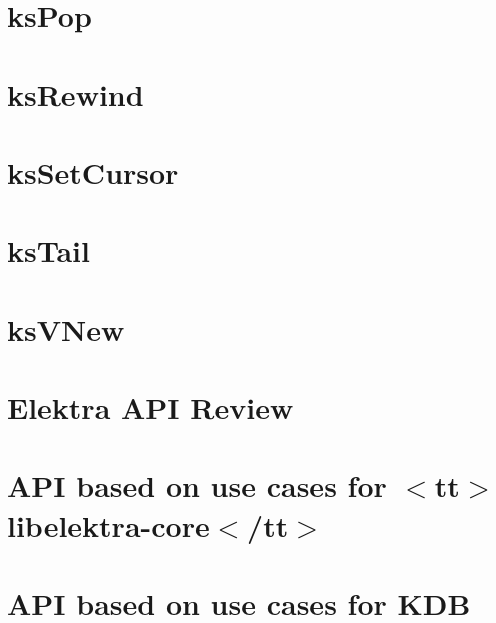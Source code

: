 \let\mypdfximage\pdfximage\def\pdfximage{\immediate\mypdfximage}\documentclass[twoside]{book}
\newcommand{\+}{\discretionary{\mbox{\scriptsize$\hookleftarrow$}}{}{}}
\begin{document}
\chapter{ks\+Pop}
\label{doc_contrib_api_reviews_core_ksPop_md}

\chapter{ks\+Rewind}
\label{doc_contrib_api_reviews_core_ksRewind_md}

\chapter{ks\+Set\+Cursor}
\label{doc_contrib_api_reviews_core_ksSetCursor_md}

\chapter{ks\+Tail}
\label{doc_contrib_api_reviews_core_ksTail_md}

\chapter{ks\+VNew}
\label{doc_contrib_api_reviews_core_ksVNew_md}

\chapter{Elektra API Review}
\label{doc_contrib_api_reviews_README_md}

\chapter{API based on use cases for $<$tt$>$libelektra-\/core$<$/tt$>$}
\label{doc_contrib_api_usecases_core_md}

\chapter{API based on use cases for KDB}
\label{doc_contrib_api_usecases_kdb_md}

\end{document}
